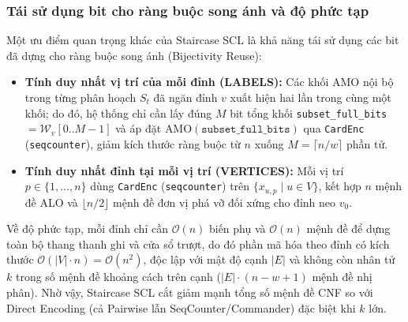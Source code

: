 \documentclass[a4paper,fleqn]{cas-sc}
\begin{document}
\subsubsection{Tái sử dụng bit cho ràng buộc song ánh và độ phức tạp}
Một ưu điểm quan trọng khác của Staircase SCL là khả năng tái sử dụng các bit đã dựng cho ràng buộc song ánh (Bijectivity Reuse):
\begin{itemize}
    \item \textbf{Tính duy nhất vị trí của mỗi đỉnh (LABELS):} Các khối AMO nội bộ trong từng phân hoạch $S_t$ đã ngăn đỉnh $v$ xuất hiện hai lần trong cùng một khối; do đó, hệ thống chỉ cần lấy đúng $M$ bit tổng khối \texttt{subset\_full\_bits} $= \mathcal{W}_v[0..M-1]$ và áp đặt $\text{AMO}(\texttt{subset\_full\_bits})$ qua \texttt{CardEnc} (\texttt{seqcounter}), giảm kích thước ràng buộc từ $n$ xuống $M = \lceil n / w \rceil$ phần tử.
    \item \textbf{Tính duy nhất đỉnh tại mỗi vị trí (VERTICES):} Mỗi vị trí $p \in \{1, \dots, n\}$ dùng \texttt{CardEnc} (\texttt{seqcounter}) trên $\{x_{u,p} \mid u \in V\}$, kết hợp $n$ mệnh đề ALO và $\lfloor n/2 \rfloor$ mệnh đề đơn vị phá vỡ đối xứng cho đỉnh neo $v_0$.
\end{itemize}

Về độ phức tạp, mỗi đỉnh chỉ cần $\mathcal{O}(n)$ biến phụ và $\mathcal{O}(n)$ mệnh đề để dựng toàn bộ thang thanh ghi và cửa sổ trượt, do đó phần mã hóa theo đỉnh có kích thước $\mathcal{O}(|V| \cdot n) = \mathcal{O}(n^2)$, độc lập với mật độ cạnh $|E|$ và không còn nhân tử $k$ trong số mệnh đề khoảng cách trên cạnh ($|E| \cdot (n - w + 1)$ mệnh đề nhị phân). Nhờ vậy, Staircase SCL cắt giảm mạnh tổng số mệnh đề CNF so với Direct Encoding (cả Pairwise lẫn SeqCounter/Commander) đặc biệt khi $k$ lớn.
\end{document}
